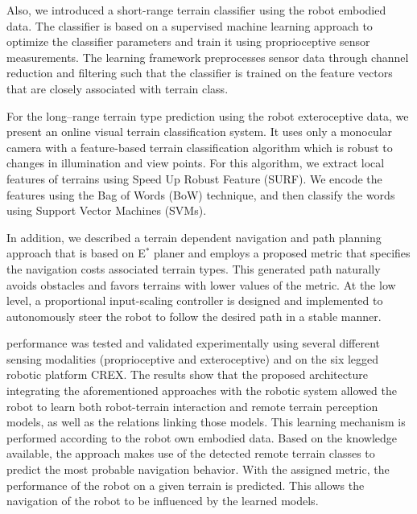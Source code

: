 
Also, we introduced a short-range terrain classifier using the robot embodied data. The classifier is based on a supervised machine learning approach to optimize the classifier parameters and train it using proprioceptive sensor measurements. The learning framework preprocesses sensor data through channel reduction and filtering such that the classifier is trained on the feature vectors that are closely associated with terrain class.

For the long--range terrain type prediction using the robot exteroceptive data, we present an online visual terrain classification system. It uses only a monocular camera with a feature-based terrain classification algorithm which is robust to changes in illumination and view points. For this algorithm, we extract local features of terrains using Speed Up Robust Feature (SURF). We encode the features using the Bag of Words (BoW) technique, and then classify the words using Support Vector Machines (SVMs).


In addition, we described a terrain dependent navigation and path planning approach that is based on E$^*$ planer and employs a proposed metric that specifies the navigation costs associated terrain types. This generated path naturally avoids obstacles and favors terrains with lower values of the metric.
At the low level, a proportional input-scaling controller is designed and implemented to autonomously steer the robot to follow the desired path in a stable manner.

\art performance was tested and validated experimentally using several different sensing modalities (proprioceptive and exteroceptive) and on the six legged robotic platform CREX.
The results show that the proposed architecture integrating the aforementioned approaches with the robotic system allowed the robot to learn both robot-terrain interaction and remote terrain perception models, as well as the relations linking those models. This learning mechanism is performed according to the robot own embodied data. Based on the knowledge available, the approach makes use of the detected remote terrain classes to predict the most probable navigation behavior. With the assigned metric, the performance of the robot on a given terrain is predicted. This allows the navigation of the robot to be influenced by the learned models.

